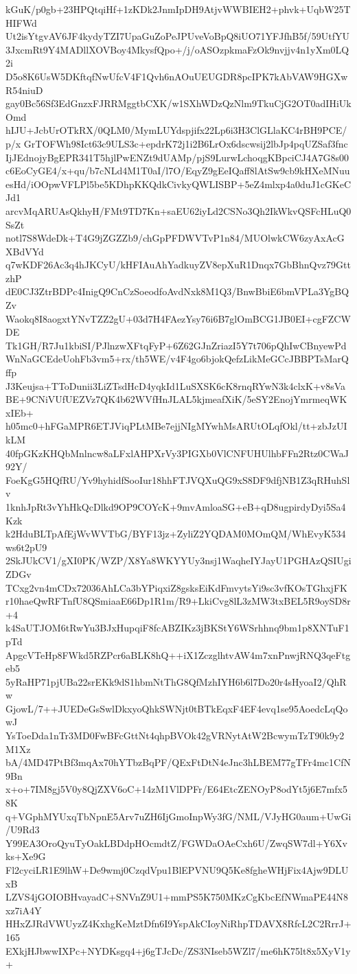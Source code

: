 kGuK/p0gb+23HPQtqiHf+1zKDk2JnmIpDH9AtjvWWBIEH2+phvk+UqbW25THIFWd
Ut2isYtgvAV6JF4kydyTZI7UpaGuZoPeJPUveVoBpQ8iUO71YFJfhB5f/59UtfYU
3JxcmRt9Y4MADllXOVBoy4MkysfQpo+/j/oASOzpkmaFzOk9nvjjv4n1yXm0LQ2i
D5o8K6UsW5DKftqfNwUfcV4F1Qvh6nAOuUEUGDR8pcIPK7kAbVAW9HGXwR54niuD
gay0Bc56Sf3EdGnzxFJRRMggtbCXK/w1SXhWDzQzNlm9TkuCjG2OT0adIHiUkOmd
hIJU+JcbUrOTkRX/0QLM0/MymLUYdspjifx22Lp6i3H3ClGLlaKC4rBH9PCE/p/x
GrTOFWh98Ict63c9ULS3c+epdrK72j1i2B6LrOx6dscwsij2lbJp4pqUZSaf3fnc
IjJEdnojyBgEPR341T5hjlPwENZt9dUAMp/pjS9LurwLchoqgKBpciCJ4A7G8s00
c6EoCyGE4/x+qu/b7cNLd4M1T0aI/l7O/EqyZ9gEeIQaff8lAtSw9cb9kHXeMNuu
esHd/iOOpwVFLPl5be5KDhpKKQdkCivkyQWLISBP+5eZ4mlxp4a0duJ1cGKeCJd1
arcvMqARUAsQkhyH/FMt9TD7Kn+saEU62iyLd2CSNo3Qh2IkWkvQSFcHLuQ0SsZt
notl7S8WdeDk+T4G9jZGZZb9/chGpPFDWVTvP1n84/MUOlwkCW6zyAxAcGXBdVYd
q7wKDF26Ac3q4hJKCyU/kHFIAuAhYadkuyZV8epXuR1Dnqx7GbBhnQvz79GttzhP
dE0CJ3ZtrBDPc4InigQ9CnCzSoeodfoAvdNxk8M1Q3/BnwBbiE6bmVPLa3YgBQZv
Waokq8I8aogxtYNvTZZ2gU+03d7H4FAezYsy76i6B7glOmBCG1JB0EI+cgFZCWDE
Tk1GH/R7Ju1kbiSI/PJlnzwXFtqFyP+6Z62GJnZriazI5Y7t706pQhIwCBnyewPd
WnNaGCEdeUohFb3vm5+rx/th5WE/v4F4go6bjokQefzLikMeGCcJBBPTsMarQffp
J3Keujsa+TToDunii3LiZTsdHcD4yqkId1LuSXSK6cK8rnqRYwN3k4clxK+v8sVa
BE+9CNiVUfUEZVz7QK4b62WVfHnJLAL5kjmeafXiK/5eSY2EnojYmrmeqWKxIEb+
h05mc0+hFGaMPR6ETJViqPLtMBe7ejjNIgMYwhMsARUtOLqfOkl/tt+zbJzUIkLM
40fpGKzKHQbMnlncw8aLFxlAHPXrVy3PIGXb0VlCNFUHUlhbFFn2Rtz0CWaJ92Y/
FoeKgG5HQfRU/Yv9hyhidfSooIur18hhFTJVQXuQG9xS8DF9dfjNB1Z3qRHuhSlv
1knhJpRt3vYhHkQcDlkd9OP9COYcK+9mvAmloaSG+eB+qD8ugpirdyDyi5Sa4Kzk
k2HduBLTpAfEjWvWVTbG/BYF13jz+ZyliZ2YQDAM0MOmQM/WhEvyK534ws6t2pU9
2SkJUkCV1/gXI0PK/WZP/X8Ya8WKYYUy3nsj1WaqheIYJayU1PGHAzQSIUgiZDGv
TCxg2vn4mCDx72036AhLCa3bYPiqxiZ8gsksEiKdFmvytsYi9sc3vfKOsTGhxjFK
r10haeQwRFTnfU8QSmiaaE66Dp1R1m/R9+LkiCvg8lL3zMW3txBEL5R9oySD8r+4
k4SaUTJOM6tRwYu3BJxHupqiF8fcABZIKz3jBKStY6WSrhhnq9bm1p8XNTuF1pTd
ApgcVTeHp8FWkd5RZPcr6aBLK8hQ++iX1ZczglhtvAW4m7xnPnwjRNQ3qeFtgeb5
5yRaHP71pjUBa22srEKk9dS1hbmNtThG8QfMzhIYH6b6l7Do20r4sHyoaI2/QhRw
GjowL/7++JUEDeGsSwlDkxyoQhkSWNjt0tBTkEqxF4EF4evq1se95AoedcLqQowJ
YsToeDda1nTr3MD0FwBFcGttNt4qhpBVOk42gVRNytAtW2BcwymTzT90k9y2M1Xz
bA/4MD47PtBf3mqAx70hYTbzBqPF/QExFtDtN4eJnc3hLBEM77gTFr4mc1CfN9Bn
x+o+7IM8gj5V0y8QjZXV6oC+14zM1VlDPFr/E64EtcZENOyP8odYt5j6E7mfx58K
q+VGphMYUxqTbNpnE5Arv7uZH6IjGmoInpWy3fG/NML/VJyHG0aum+UwGi/U9Rd3
Y99EA3OroQyuTyOakLBDdpHOcmdtZ/FGWDaOAeCxh6U/ZwqSW7dl+Y6Xvks+Xe9G
Fl2cyciLR1E9lhW+De9wmj0CzqdVpu1BlEPVNU9Q5Ke8fgheWHjFix4Ajw9DLUxB
LZVS4jGOIOBHvayadC+SNVnZ9U1+mmPS5K750MKzCgKbcEfNWmaPE44N8xz7iA4Y
HHxZJRdVWUyzZ4KxhgKeMztDfn6I9YspAkCIoyNiRhpTDAVX8RfcL2C2RrrJ+165
EXkjHJbwwIXPc+NYDKsgq4+j6gTJcDc/ZS3NIseb5WZl7/me6hK75lt8x5XyV1y+
